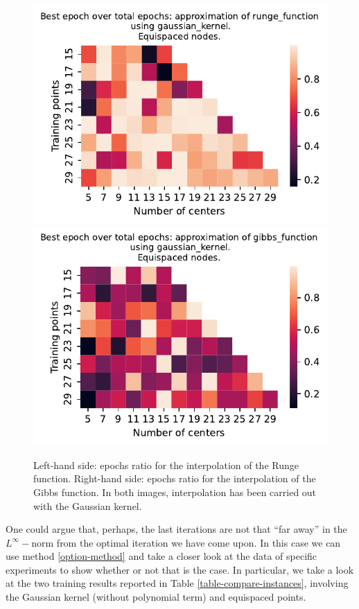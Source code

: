 \documentclass[12pt]{report} %
\begin{document}
\begin{figure}[ht]
    \centering
    \includegraphics[width=.49\textwidth]{imagenes/experiments/1d/variational_epochs/runge_function-Kgaussian_kernel-Equi-epochs.pdf}
    \includegraphics[width=.49\textwidth]{imagenes/experiments/1d/variational_epochs/gibbs_function-Kgaussian_kernel-Equi-epochs.pdf}
    \caption{Left-hand side: epochs ratio for the interpolation of the Runge function. Right-hand side: epochs ratio for the interpolation of the Gibbs function. In both images, interpolation has been carried out with the Gaussian kernel.}
    \label{fig:epochs-gaussian-kernel-report}
\end{figure}

One could argue that, perhaps, the last iterations are not that ``far away'' in the $L^\infty-$norm from the optimal iteration we have come upon. In this case we can use method \ref{option-method} and take a closer look at the data of specific experiments to show whether or not that is the case. In particular, we take a look at the two training results reported in Table
\ref{table-compare-instances}, involving the Gaussian kernel (without
polynomial term) and equispaced points.
\end{document}
